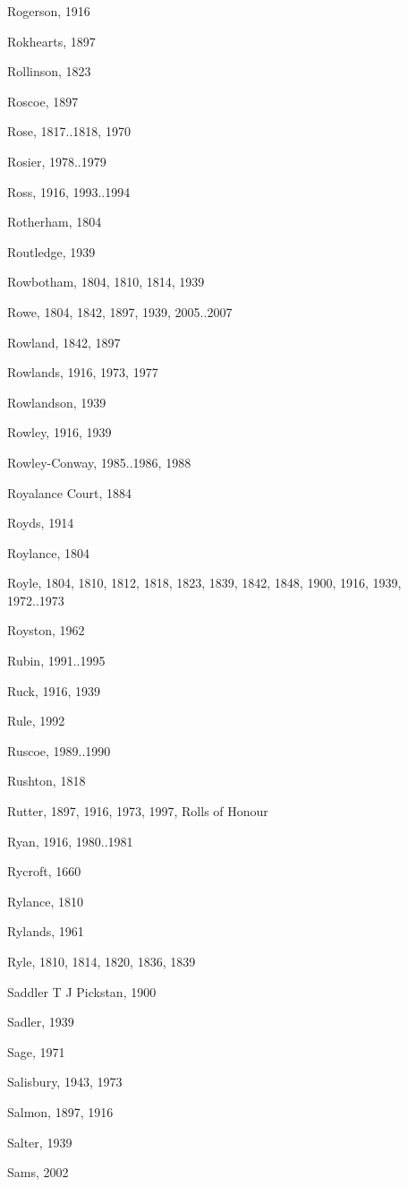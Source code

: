 {\begin{theindex}
\item Rogerson, 1916
\item Rokhearts, 1897
\item Rollinson, 1823
\item Roscoe, 1897
\item Rose, 1817..1818, 1970
\item Rosier, 1978..1979
\item Ross, 1916, 1993..1994
\item Rotherham, 1804
\item Routledge, 1939
\item Rowbotham, 1804, 1810, 1814, 1939
\item Rowe, 1804, 1842, 1897, 1939, 2005..2007
\item Rowland, 1842, 1897
\item Rowlands, 1916, 1973, 1977
\item Rowlandson, 1939
\item Rowley, 1916, 1939
\item Rowley-Conway, 1985..1986, 1988
\item Royalance Court, 1884
\item Royds, 1914
\item Roylance, 1804
\item Royle, 1804, 1810, 1812, 1818, 1823, 1839, 1842, 1848, 1900, 1916, 1939, 1972..1973
\item Royston, 1962
\item Rubin, 1991..1995
\item Ruck, 1916, 1939
\item Rule, 1992
\item Ruscoe, 1989..1990
\item Rushton, 1818
\item Rutter, 1897, 1916, 1973, 1997, Rolls of Honour
\item Ryan, 1916, 1980..1981
\item Rycroft, 1660
\item Rylance, 1810
\item Rylands, 1961
\item Ryle, 1810, 1814, 1820, 1836, 1839
\item Saddler T J Pickstan, 1900
\item Sadler, 1939
\item Sage, 1971
\item Salisbury, 1943, 1973
\item Salmon, 1897, 1916
\item Salter, 1939
\item Sams, 2002

\end{theindex}}
